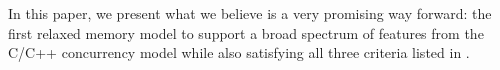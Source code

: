 In this paper, we present what we believe is a very promising way
forward: the first relaxed memory model to support a broad spectrum
of features from the C/C++ concurrency model while also satisfying all
three criteria listed in .










